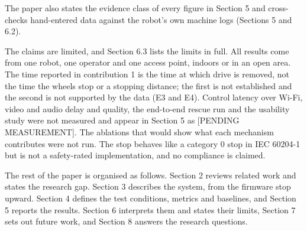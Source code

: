 The paper also states the evidence class of every figure in Section 5 and cross-checks hand-entered data against the robot's own machine logs (Sections 5 and 6.2).

The claims are limited, and Section 6.3 lists the limits in full. All results come from one robot, one operator and one access point, indoors or in an open area. The time reported in contribution 1 is the time at which drive is removed, not the time the wheels stop or a stopping distance; the first is not established and the second is not supported by the data (E3 and E4). Control latency over Wi-Fi, video and audio delay and quality, the end-to-end rescue run and the usability study were not measured and appear in Section 5 as [PENDING MEASUREMENT]. The ablations that would show what each mechanism contributes were not run. The stop behaves like a category 0 stop in IEC 60204-1 \cite{iec60204} but is not a safety-rated implementation, and no compliance is claimed.

The rest of the paper is organised as follows. Section 2 reviews related work and states the research gap. Section 3 describes the system, from the firmware stop upward. Section 4 defines the test conditions, metrics and baselines, and Section 5 reports the results. Section 6 interprets them and states their limits, Section 7 sets out future work, and Section 8 answers the research questions.
